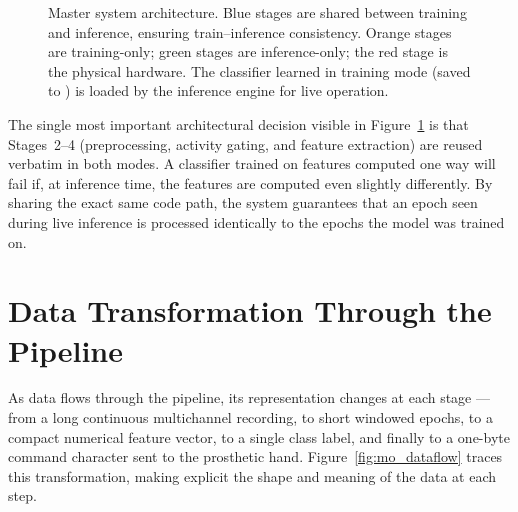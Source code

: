 \begin{figure}[htbp]
\caption{Master system architecture. Blue stages are shared between
training and inference, ensuring train--inference consistency.
Orange stages are training-only; green stages are inference-only;
the red stage is the physical hardware. The classifier learned in
training mode (saved to ) is loaded by
the inference engine for live operation.}
\label{fig:mo_master}
\end{figure}

The single most important architectural decision visible in
Figure~\ref{fig:mo_master} is that Stages~2--4 (preprocessing,
activity gating, and feature extraction) are reused verbatim in
both modes. A classifier trained on features computed one way will
fail if, at inference time, the features are computed even slightly
differently. By sharing the exact same code path, the system
guarantees that an epoch seen during live inference is processed
identically to the epochs the model was trained on.

\section{Data Transformation Through the Pipeline}
\label{sec:mo_dataflow}

As data flows through the pipeline, its representation changes at
each stage --- from a long continuous multichannel recording, to
short windowed epochs, to a compact numerical feature vector, to a
single class label, and finally to a one-byte command character
sent to the prosthetic hand. Figure~\ref{fig:mo_dataflow} traces
this transformation, making explicit the shape and meaning of the
data at each step.

